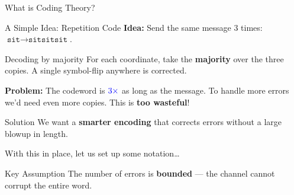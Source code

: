 \documentclass[10pt,handout]{beamer}
\begin{document}
\begin{frame}{What is Coding Theory?}
\begin{center}
	\end{center}
	\vspace{0.1em}

\end{frame}

\begin{frame}{A Simple Idea: Repetition Code}
	\textbf{Idea:} Send the same message ${3}$ times: ${\texttt{sit} \to \texttt{sitsitsit}}$.
	\vspace{0.5em}

	\begin{block}{Decoding by majority}
		For each coordinate, take the \textbf{majority} over the three copies. A single symbol-flip anywhere is corrected.
	\end{block}\pause
	\vfill

	\textbf{Problem:} The codeword is $\textcolor{blue}{3\times}$ as long as the message. To handle more errors we'd need even more copies. This is \textbf{too wasteful}!

\end{frame}

\begin{frame}{Solution}
	We want a \textbf{smarter encoding} that corrects errors without a large blowup in length.

	\vspace{0.7em}
	With this in place, let us set up some notation\ldots\pause

	\vfill
	\begin{block}{Key Assumption}
		The number of errors is \textbf{bounded} --- the channel cannot corrupt the entire word.
	\end{block}

\end{frame}
\end{document}
